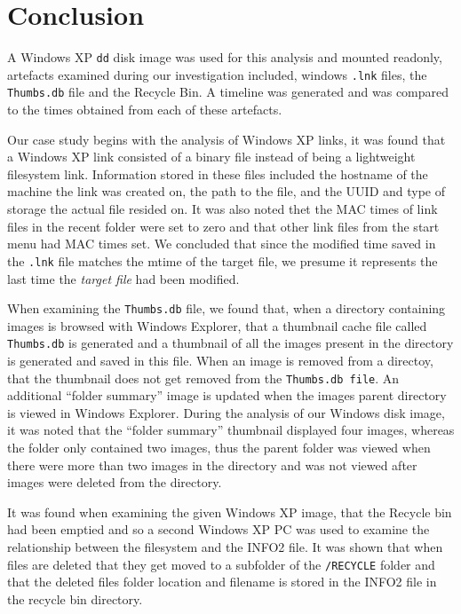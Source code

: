 \documentclass[a4paper,
    11pt,
    normalheadings,
    parindent,
    UKenglish,
    abstracton,
    ]{scrartcl}
\begin{document}
\section{Conclusion}


A Windows XP \texttt{dd} disk image was used for this analysis and mounted readonly, artefacts examined during our investigation included, windows \texttt{.lnk} files, the \texttt{Thumbs.db} file and the Recycle Bin. A timeline was generated and was compared to the times obtained from each of these artefacts.

Our case study begins with the analysis of Windows XP links, it was found that a Windows XP link consisted of a binary file instead of being a lightweight filesystem link.
Information stored in these files included the hostname of the machine the link was created on, the path to the file, and the UUID and type of storage the actual file resided on.
It was also noted thet the MAC times of link files in the recent folder were set to zero and that other link files from the start menu had MAC times set.
We concluded that since the modified time saved in the \texttt{.lnk} file matches the mtime of the target file, we presume it represents the last time the \emph{target file} had been modified.

When examining the \texttt{Thumbs.db} file, we found that, when a directory containing images is browsed with Windows Explorer, that a thumbnail cache file called \texttt{Thumbs.db} is generated and a thumbnail of all the images present in the directory is generated and saved in this file.
When an image is removed from a directoy, that the thumbnail does not get removed from the \texttt{Thumbs.db file}.
An additional ``folder summary'' image is updated when the images parent directory is viewed in Windows Explorer.
During the analysis of our Windows disk image, it was noted that the ``folder summary'' thumbnail displayed four images, whereas the folder only contained two images, thus the parent folder was viewed when there were more than two images in the directory and was not viewed after images were deleted from the directory.

It was found when examining the given Windows XP image, that the Recycle bin had been emptied and so a second Windows XP PC was used to examine the relationship between the filesystem and the INFO2 file.
It was shown that when files are deleted that they get moved to a subfolder of the \texttt{/RECYCLE} folder and that the deleted files folder location and filename is stored in the INFO2 file in the recycle bin directory.
\end{document}
